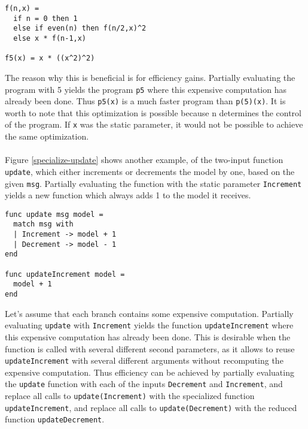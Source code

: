 \begin{lstlisting}[columns=fullflexible, label={specialize-easy}, language=Other, caption={Specialization of a program to compute $x^n$}]
f(n,x) =
  if n = 0 then 1
  else if even(n) then f(n/2,x)^2
  else x * f(n-1,x)

f5(x) = x * ((x^2)^2)
\end{lstlisting}

The reason why this is beneficial is for efficiency gains. Partially evaluating the program with 5 yields the program \texttt{p5} where this expensive computation has already been done. Thus \texttt{p5(x)} is a much faster program than \texttt{p(5)(x)}. It is worth to note that this optimization is possible because n determines the control of the program. If \texttt{x} was the static parameter, it would not be possible to achieve the same optimization. 
\\\\
Figure \ref{specialize-update} shows another example, of the two-input function \texttt{update}, which either increments or decrements the model by one, based on the given \texttt{msg}. Partially evaluating the function with the static parameter \texttt{Increment} yields a new function which always adds 1 to the model it receives. 

\begin{lstlisting}[columns=fullflexible, label={specialize-update}, language=JaLi, caption={Specialization of the update function on increment}]
func update msg model =
  match msg with
  | Increment -> model + 1
  | Decrement -> model - 1
end

func updateIncrement model =
  model + 1
end
\end{lstlisting}

Let's assume that each branch contains some expensive computation. Partially evaluating \texttt{update} with \texttt{Increment} yields the function \texttt{updateIncrement} where this expensive computation has already been done. This is desirable when the function is called with several different second parameters, as it allows to reuse \texttt{updateIncrement} with several different arguments without recomputing the expensive computation. Thus efficiency can be achieved by partially evaluating the \texttt{update} function with each of the inputs \texttt{Decrement} and \texttt{Increment}, and replace all calls to \texttt{update(Increment)} with the specialized function \texttt{updateIncrement}, and replace all calls to \texttt{update(Decrement)} with the reduced function \texttt{updateDecrement}.

